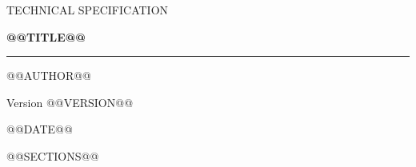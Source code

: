 \documentclass[11pt,@@PAPER@@]{scrartcl}
\begin{document}
\begin{titlepage}
\color{ink}
\vspace*{20mm}
{\sffamily\small TECHNICAL SPECIFICATION\par}
\vspace{8mm}
{\sffamily\Huge\bfseries @@TITLE@@\par}
\vspace{6mm}
{\color{accent}\rule{48mm}{2pt}\par}
\vfill
{\large @@AUTHOR@@\par}
\vspace{4mm}
Version @@VERSION@@\par
@@DATE@@\par
\end{titlepage}
\tableofcontents
\clearpage
@@SECTIONS@@
\end{document}
